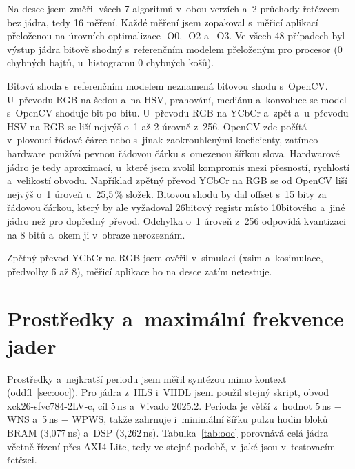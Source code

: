 
Na desce jsem změřil všech 7 algoritmů v~obou verzích a~2 průchody řetězcem bez jádra, tedy 16 měření. Každé měření jsem zopakoval s~měřicí aplikací přeloženou na úrovních optimalizace -O0, -O2 a~-O3. Ve všech 48 případech byl výstup jádra bitově shodný s~referenčním modelem přeloženým pro procesor (0 chybných bajtů, u~histogramu 0 chybných košů).

Bitová shoda s~referenčním modelem neznamená bitovou shodu s~OpenCV. U~převodu RGB na šedou a~na HSV, prahování, mediánu a~konvoluce se model s~OpenCV shoduje bit po bitu. U~převodu RGB na YCbCr a~zpět a~u~převodu HSV na RGB se liší nejvýš o~1 až 2 úrovně z~256. OpenCV zde počítá v~plovoucí řádové čárce nebo s~jinak zaokrouhlenými koeficienty, zatímco hardware používá pevnou řádovou čárku s~omezenou šířkou slova. Hardwarové jádro je tedy aproximací, u~které jsem zvolil kompromis mezi přesností, rychlostí a~velikostí obvodu. Například zpětný převod YCbCr na RGB se od OpenCV liší nejvýš o~1 úroveň u~25,5\,\% složek. Bitovou shodu by dal offset s~15 bity za řádovou čárkou, který by ale vyžadoval 26bitový registr místo 10bitového a~jiné jádro než pro dopředný převod. Odchylka o~1 úroveň z~256 odpovídá kvantizaci na 8 bitů a~okem ji v~obraze nerozeznám.


Zpětný převod YCbCr na RGB jsem ověřil v~simulaci (xsim a~kosimulace, předvolby 6 až 8), měřicí aplikace ho na desce zatím netestuje.

\section{Prostředky a~maximální frekvence jader}
\label{sec:vooc}

Prostředky a~nejkratší periodu jsem měřil syntézou mimo kontext (oddíl~\ref{sec:ooc}). Pro jádra z~HLS i~VHDL jsem použil stejný skript, obvod xck26-sfvc784-2LV-c, cíl 5\,ns a~Vivado 2025.2. Perioda je větší z~hodnot 5\,ns − WNS a~5\,ns − WPWS, takže zahrnuje i~minimální šířku pulzu hodin bloků BRAM (3,077\,ns) a~DSP (3,262\,ns). Tabulka~\ref{tab:ooc} porovnává celá jádra včetně řízení přes AXI4-Lite, tedy ve stejné podobě, v~jaké jsou v~testovacím řetězci.


